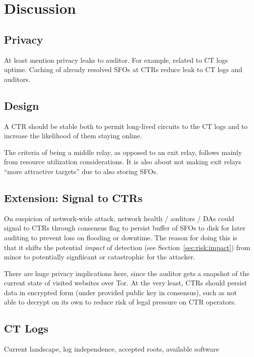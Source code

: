 \section{Discussion} \label{sec:discussion}

\subsection{Privacy}
At least mention privacy leaks to auditor. For example, related to CT logs
uptime. Caching of already resolved SFOs at CTRs reduce leak to CT logs and
auditors.

\subsection{Design}
A CTR should be stable both to permit long-lived circuits to the CT logs and
to increase the likelihood of them staying online.

The criteria of being a middle relay, as opposed to an exit relay, follows
mainly from resource utilization considerations.  It is also about not making
exit relays ``more attractive targets'' due to also storing SFOs.

\subsection{Extension: Signal to CTRs}
On suspicion of network-wide attack, network health / auditors / DAs could
signal to CTRs through consensus flag to persist buffer of SFOs to disk for
later auditing to prevent loss on flooding or downtime. The reason for doing
this is that it shifts the potential \emph{impact} of detection (see
Section~\ref{sec:risk:impact}) from minor to potentially signfiicant or
catastrophic for the attacker.

There are huge privacy implications here, since the auditor gets a snapshot of
the current state of visited websites over Tor. At the very least, CTRs should
persist data in encrypted form (under provided public key in consensus), such as
not able to decrypt on its own to reduce risk of legal pressure on CTR
operators.

\subsection{CT Logs} \label{sec:discussion:logs}
Current landscape, log independence, accepted roots, available software
